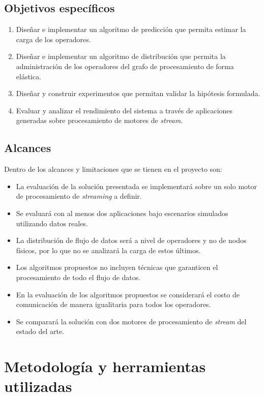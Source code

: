 \subsection{Objetivos específicos}
\begin{enumerate}
	\item Dise\~nar e implementar un algoritmo de predicci\'on que permita estimar la carga de los operadores.
	\item Dise\~nar e implementar un algoritmo de distribuci\'on que permita la administraci\'on de los operadores del grafo de procesamiento de forma el\'astica.
	\item Dise\~nar y construir experimentos que permitan validar la hip\'otesis formulada.
	\item Evaluar y analizar el rendimiento del sistema a trav\'es de aplicaciones generadas sobre procesamiento de motores de \textit{stream}.
\end{enumerate}

\subsection{Alcances}
Dentro de los alcances y limitaciones que se tienen en el proyecto son:
\begin{itemize}
	\item La evaluación de la solución presentada se implementará sobre un solo motor de procesamiento de \textit{streaming} a definir.
	\item Se evaluará con al menos dos aplicaciones bajo escenarios simulados utilizando datos reales.
	\item La distribución de flujo de datos será a nivel de operadores y no de nodos f\'isicos, por lo que no se analizará la carga de estos \'ultimos.
	\item Los algoritmos propuestos no incluyen t\'ecnicas que garanticen el procesamiento de todo el flujo de datos.
	\item En la evaluación de los algoritmos propuestos se considerará el costo de comunicación de manera igualitaria para todos los operadores.
	\item Se comparará la solución con dos motores de procesamiento de \textit{stream} del estado del arte.
\end{itemize}


\section{Metodología y herramientas utilizadas}
\label{intro:metodologia}


